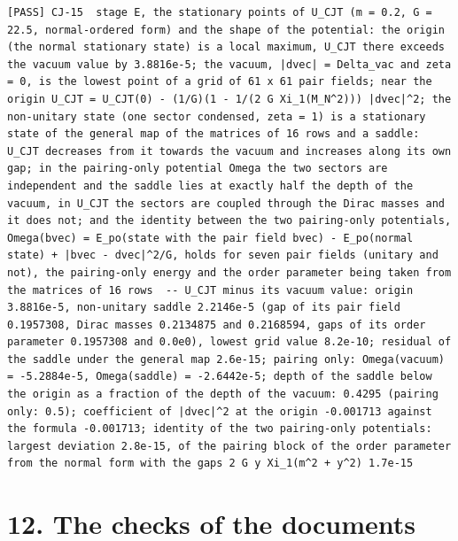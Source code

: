 \documentclass[
  10pt,
]{article}
\begin{document}
\begin{verbatim}
[PASS] CJ-15  stage E, the stationary points of U_CJT (m = 0.2, G = 22.5, normal-ordered form) and the shape of the potential: the origin (the normal stationary state) is a local maximum, U_CJT there exceeds the vacuum value by 3.8816e-5; the vacuum, |dvec| = Delta_vac and zeta = 0, is the lowest point of a grid of 61 x 61 pair fields; near the origin U_CJT = U_CJT(0) - (1/G)(1 - 1/(2 G Xi_1(M_N^2))) |dvec|^2; the non-unitary state (one sector condensed, zeta = 1) is a stationary state of the general map of the matrices of 16 rows and a saddle: U_CJT decreases from it towards the vacuum and increases along its own gap; in the pairing-only potential Omega the two sectors are independent and the saddle lies at exactly half the depth of the vacuum, in U_CJT the sectors are coupled through the Dirac masses and it does not; and the identity between the two pairing-only potentials, Omega(bvec) = E_po(state with the pair field bvec) - E_po(normal state) + |bvec - dvec|^2/G, holds for seven pair fields (unitary and not), the pairing-only energy and the order parameter being taken from the matrices of 16 rows  -- U_CJT minus its vacuum value: origin 3.8816e-5, non-unitary saddle 2.2146e-5 (gap of its pair field 0.1957308, Dirac masses 0.2134875 and 0.2168594, gaps of its order parameter 0.1957308 and 0.0e0), lowest grid value 8.2e-10; residual of the saddle under the general map 2.6e-15; pairing only: Omega(vacuum) = -5.2884e-5, Omega(saddle) = -2.6442e-5; depth of the saddle below the origin as a fraction of the depth of the vacuum: 0.4295 (pairing only: 0.5); coefficient of |dvec|^2 at the origin -0.001713 against the formula -0.001713; identity of the two pairing-only potentials: largest deviation 2.8e-15, of the pairing block of the order parameter from the normal form with the gaps 2 G y Xi_1(m^2 + y^2) 1.7e-15
\end{verbatim}

\hypertarget{the-checks-of-the-documents}{%
\section{12. The checks of the
documents}\label{the-checks-of-the-documents}}
\end{document}
